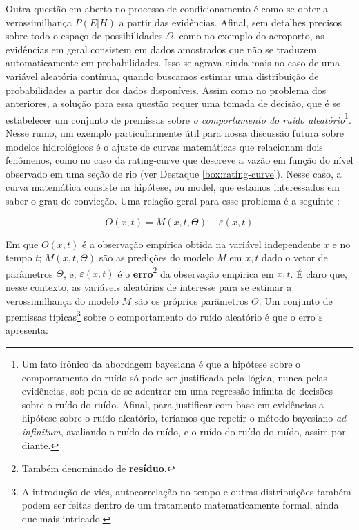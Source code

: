 \documentclass[./main.tex]{subfiles}
\begin{document}
\par Outra questão em aberto no processo de condicionamento é como se obter a verossimilhança $P(E | H)$ a partir das evidências. Afinal, sem detalhes precisos sobre todo o espaço de possibilidades $\Omega$, como no exemplo do aeroporto, as evidências em geral consistem em dados amostrados que não se traduzem automaticamente em probabilidades. Isso se agrava ainda mais no caso de uma variável aleatória contínua, quando buscamos estimar uma distribuição de probabilidades a partir dos dados disponíveis. Assim como no problema dos anteriores, a solução para essa questão requer uma tomada de decisão, que é se estabelecer um conjunto de premissas sobre \textit{o comportamento do ruído aleatório}\footnote{Um fato irônico da abordagem bayesiana é que a hipótese sobre o comportamento do ruído só pode ser justificada pela lógica, nunca pelas evidências, sob pena de se adentrar em uma regressão infinita de decisões sobre o ruído do ruído. Afinal, para justificar com base em evidências a hipótese sobre o ruído aleatório, teríamos que repetir o método bayesiano \textit{ad infinitum}, avaliando o ruído do ruído, e o ruído do ruído do ruído, assim por diante.}. Nesse rumo, um exemplo particularmente útil para nossa discussão futura sobre modelos hidrológicos é o ajuste de curvas matemáticas que relacionam dois fenômenos, como no caso da \gls{rating-curve} que descreve a vazão em função do nível observado em uma seção de rio (ver Destaque \ref{box:rating-curve}).  Nesse caso, a curva matemática consiste na hipótese, ou \gls{model}, que estamos interessados em saber o grau de convicção.  Uma relação geral para esse problema é a seguinte \cite{Box1979}:
\begin{linenomath*}
\begin{equation}
\label{eq:bayes-model}
    O(x, t) = M(x, t, \Theta) + \varepsilon(x, t)
\end{equation}
\end{linenomath*}
Em que $O(x, t)$ é a observação empírica obtida na variável independente $x$ e no tempo $t$; $M(x, t, \Theta)$ são as predições do modelo $M$ em $x,t$ dado o vetor de parâmetros $\Theta$, e; $\varepsilon(x, t)$ é o \textbf{erro}\footnote{Também denominado de \textbf{resíduo}.} da observação empírica em $x,t$. É claro que, nesse contexto, as variáveis aleatórias de interesse para se estimar a verossimilhança do modelo $M$ são os próprios parâmetros $\Theta$. Um conjunto de premissas típicas\footnote{A introdução de viés, autocorrelação no tempo e outras distribuições também podem ser feitas dentro de um tratamento matematicamente formal, ainda que mais intricado.} sobre o comportamento do ruído aleatório é que o erro $\varepsilon$ apresenta:
\end{document}
